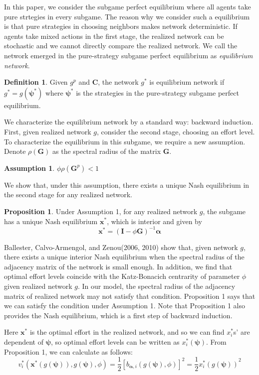 \documentclass[12pt]{article}
\theoremstyle{definition}
\newtheorem{proposition}{Proposition}
\newtheorem{definition}{Definition}
\newtheorem{assumption}{Assumption}
\begin{document}
In this paper, we consider the subgame perfect equilibrium where all agents take pure strtegies in every subgame.
The reason why we consider such a equilibrium is that pure strategies in choosing neighbors makes network deterministic.
If agents take mixed actions in the first stage, the realized network can be stochastic and we cannot directly compare the realized network.
We call the network emerged in the pure-strategy subgame perfect equilibrium as {\it{equilibrium network}}.

\begin{definition}
Given $g^p$ and $\bm{C}$, the network $g^*$ is equilibrium network if $g^* = g(\bm{\psi}^*)$ where $\bm{\psi}^*$ is the strategies in the pure-strategy subgame perfect equilibrium.
\end{definition}

We characterize the equilibrium network by a standard way: backward induction.
First, given realized network $g$, consider the second stage, choosing an effort level.
To characterize the equilibrium in this subgame, we require a new assumption.
Denote $\rho (\bm{G})$ as the spectral radius of the matrix $\bm{G}$.

\begin{assumption}
$\phi \rho(\bm{G}^p) < 1$
\end{assumption}

We show that, under this assumption, there exists a unique Nash equilibrium in the second stage for any realized network.

\begin{proposition}
Under Assumption 1, for any realized network $g$, the subgame has a unique Nash equilibrium $\bm{x}^*$, which is interior and given by
\[ \bm{x}^* = {(\bm{I} - \phi \bm{G})}^{-1} \bm{\alpha} \]
\end{proposition}

Ballester, Calvo-Armengol, and Zenou(2006, 2010) show that, given network $g$, there exists a unique interior Nash equilibrium when the spectral radius of the adjacency matrix of the network is small enough.
In addition, we find that optimal effort levels coincide with the Katz-Bonacich centrarity of parameter $\phi$ given realized network $g$.
In our model, the spectral radius of the adjacency matrix of realized network may not satisfy that condition.
Proposition 1 says that we can satisfy the condition under Assumption 1.
Note that Proposition 1 also provides the Nash equilibrium, which is a first step of backward induction.

Here $\bm{x}^*$ is the optimal effort in the realized network, and so we can find $x_i^*$s' are dependent of $\bm{\psi}$, so optimal effort levels can be written as $x_i^*(\bm{\psi})$.
From Proposition 1, we can calculate as follows:
\[ v_i^*(\bm{x}^*(g(\bm{\psi})), g(\bm{\psi}), \phi) = \frac{1}{2} {[b_{\bm{\alpha}, i}(g(\bm{\psi}), \phi)]}^2 = \frac{1}{2} {x_i^*(g(\bm{\psi}))}^2 \]
\end{document}
